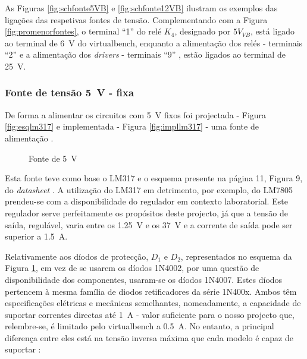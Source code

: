 As Figuras \ref{fig:schfonte5VB} e \ref{fig:schfonte12VB} ilustram os exemplos das ligações das respetivas fontes de tensão. Complementando com a Figura \ref{fig:promenorfontes}, o terminal ``1'' do relé $K_{4}$, designado por $5V_{VB}$, está ligado ao terminal de \SI{6}{\volt} do \acrshort{virtualbench}, enquanto a alimentação dos relés -  terminais ``2'' e a alimentação dos \textit{drivers} -  terminais ``9'' , estão ligados ao terminal de \SI{25}{\volt}. 

\subsubsection{Fonte de tensão \SI{5}{\volt} - fixa}
De forma a alimentar os circuitos com \SI{5}{\volt} fixos foi projectada - Figura \ref{fig:esqlm317} e implementada - Figura \ref{fig:impllm317} - uma fonte de alimentação \cite{LM317}.

\begin{figure}[hbtp]
	\centering%
		\centering
		\qquad
		\caption{Fonte de \SI{5}{\volt} }%
		\label{fig:fonte5V}%
	\end{figure}

Esta fonte teve como base o LM317 e o esquema presente na página 11, Figura 9, do \textit{datasheet} \cite{LM317}. A utilização do LM317 em detrimento, por exemplo, do LM7805 prendeu-se com a disponibilidade do regulador em contexto laboratorial. Este regulador serve perfeitamente os propósitos deste projecto, já que a tensão de saída, regulável, varia entre os \SI{1.25}{\volt} e os \SI{37}{\volt} e a corrente de saída pode ser superior a \SI{1.5}{\ampere}. 

Relativamente aos díodos de protecção, $D_{1}$ e $D_{2}$, representados no esquema da Figura \ref{fig:fonte5V}, em vez de se usarem os díodos 1N4002, por uma questão de disponibilidade dos componentes, usaram-se os díodos 1N4007. Estes díodos pertencem à mesma família de diodos retificadores da série 1N400x. Ambos têm especificações elétricas e mecânicas semelhantes, nomeadamente, a capacidade de suportar correntes directas até \SI{1}{\ampere} - valor suficiente para o nosso projecto que, relembre-se, é limitado pelo \acrshort{virtualbench} a \SI{0.5}{\ampere}. No entanto, a principal diferença entre eles está na tensão inversa máxima que cada modelo é capaz de suportar \cite{1N400x}:

